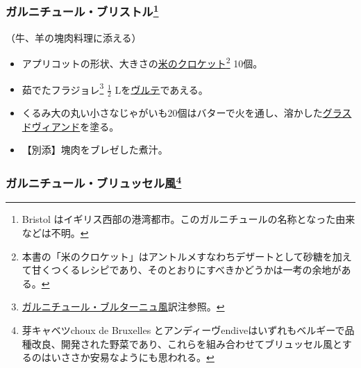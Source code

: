 \begin{recette}
\atoaki{}

\hypertarget{garniture-bristol}{%
\subsubsection[ガルニチュール・ブリストル]{\texorpdfstring{ガルニチュール・ブリストル\footnote{Bristol
  はイギリス西部の港湾都市。このガルニチュールの名称となった由来などは不明。}}{ガルニチュール・ブリストル}}\label{garniture-bristol}}



（牛、羊の塊肉料理に添える）

\begin{itemize}
\item
  アプリコットの形状、大きさの\protect\hyperlink{croquettes-de-riz}{米のクロケット}\footnote{本書の「米のクロケット」はアントルメすなわちデザートとして砂糖を加えて甘くつくるレシピであり、そのとおりにすべきかどうかは一考の余地がある。}
  10個。
\item
  茹でたフラジョレ\footnote{\protect\hyperlink{garniture-bretonne}{ガルニチュール・ブルターニュ風}訳注参照。}
  \(\frac{1}{2}\) Lを\protect\hyperlink{veloute}{ヴルテ}であえる。
\item
  くるみ大の丸い小さなじゃがいも20個はバターで火を通し、溶かした\protect\hyperlink{glace-de-viande}{グラスドヴィアンド}を塗る。
\item
  【別添】塊肉をブレゼした煮汁。
\end{itemize}

\atoaki{}

\hypertarget{garniture-bluxelloise}{%
\subsubsection[ガルニチュール・ブリュッセル風]{\texorpdfstring{ガルニチュール・ブリュッセル風\footnote{芽キャベツchoux
  de Bruxelles
  とアンディーヴendiveはいずれもベルギーで品種改良、開発された野菜であり、これらを組み合わせてブリュッセル風とするのはいささか安易なようにも思われる。}}{ガルニチュール・ブリュッセル風}}\label{garniture-bluxelloise}}



\end{recette}
